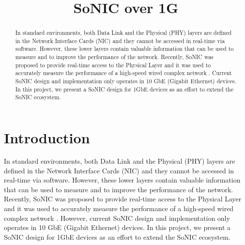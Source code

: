\documentclass[conference]{IEEEtran}
\begin{document}
%
\title{SoNIC over 1G}


\author{
}

\maketitle


\begin{abstract}

In standard environments, both Data Link and the Physical (PHY) layers are defined in the Network Interface Cards (NIC) and they cannot be accessed in real-time via software. However, these lower layers contain valuable information that can be used to measure and to improve the performance of the network. Recently, SoNIC \cite{lee2013sonic} was proposed to provide real-time access to the Physical Layer and it was used to accurately measure the performance of a high-speed wired complex network \cite{wang2014timing}. Current SoNIC design and implementation only operates in 10 GbE (Gigabit Ethernet) devices. In this project, we present a SoNIC design for 1GbE devices as an effort to extend the SoNIC ecosystem.

\end{abstract}

\IEEEpeerreviewmaketitle

\section{Introduction}

In standard environments, both Data Link and the Physical (PHY) layers are defined in the Network Interface Cards (NIC) and they cannot be accessed in real-time via software. However, these lower layers contain valuable information that can be used to measure and to improve the performance of the network. Recently, SoNIC \cite{lee2013sonic} was proposed to provide real-time access to the Physical Layer and it was used to accurately measure the performance of a high-speed wired complex network \cite{wang2014timing}. However, current SoNIC design and implementation only operates in 10 GbE (Gigabit Ethernet) devices. In this project, we present a SoNIC design for 1GbE devices as an effort to extend the SoNIC ecosystem.
\end{document}

